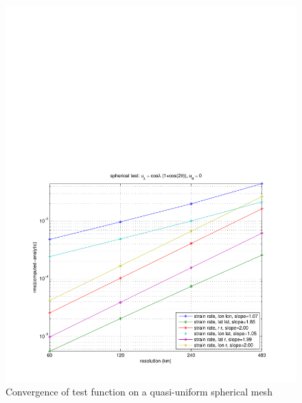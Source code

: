 \documentclass[11pt]{report}
\begin{document}
\begin{figure}[htbp]
 \center
 \includegraphics[scale=0.8, trim = 0 0 0 4in, clip]{f/a19_sph_conv_test_1.pdf}
 \caption{Convergence of test function on a quasi-uniform spherical mesh}
 \label{fig:convergence1}
\end{figure}
\end{document}
